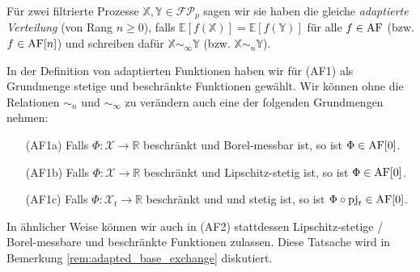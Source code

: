 \begin{definition}
Für zwei filtrierte Prozesse $\mathbb{X,Y} \in \mathcal{FP}_p$ sagen wir sie haben die gleiche \emph{adaptierte Verteilung} (von Rang $n\geq 0$), falls $\mathbb{E}[f(\mathbb{X})] = \mathbb{E}[f(\mathbb{Y})]$ für alle $f \in \operatorname{AF}$ (bzw. $f \in \operatorname{AF}[n]$) und schreiben dafür $\mathbb{X} \sim_\infty \mathbb{Y}$ (bzw. $\mathbb{X} \sim_n \mathbb{Y}$).
\end{definition}

\begin{remark}\label{thm:adapted_functions_base_change}
    In der Definition von adaptierten Funktionen haben wir für (AF1) als Grundmenge stetige und beschränkte Funktionen gewählt. Wir können ohne die Relationen $\sim_n$ und $\sim_\infty$ zu verändern auch eine der folgenden Grundmengen nehmen:
    \begin{itemize}
        \item[(AF1a)] Falls $\Phi: \mathcal{X}\rightarrow \mathbb{R}$ beschränkt und Borel-messbar ist, so ist $\Phi \in \operatorname{AF}[0]$.
        \item[(AF1b)] Falls $\Phi: \mathcal{X}\rightarrow \mathbb{R}$ beschränkt und Lipschitz-stetig ist, so ist $\Phi \in \operatorname{AF}[0]$.
        \item[(AF1c)] Falls $\Phi: \mathcal{X}_t\rightarrow \mathbb{R}$ beschränkt und und stetig ist, so ist $\Phi \circ \operatorname{pj}_t \in \operatorname{AF}[0]$.
    \end{itemize}
    In ähnlicher Weise können wir auch in (AF2) stattdessen Lipschitz-stetige / Borel-messbare und beschränkte Funktionen zulassen. Diese Tatsache wird in Bemerkung \ref{rem:adapted_base_exchange} diskutiert.
\end{remark}

